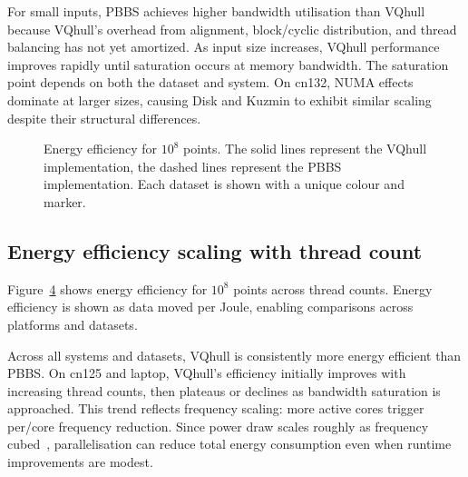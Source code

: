 For small inputs, PBBS achieves higher bandwidth utilisation than VQhull because VQhull's overhead from alignment, block\-/cyclic distribution, and thread balancing has not yet amortized.
As input size increases, VQhull performance improves rapidly until saturation occurs at memory bandwidth.
The saturation point depends on both the dataset and system.
On cn132, NUMA effects dominate at larger sizes, causing Disk and Kuzmin to exhibit similar scaling despite their structural differences.

\begin{figure}[t]
  \scriptsize
  \begin{subfigure}[b]{0.33\linewidth}
    \centering
    \label{fig:energy-cn125}%
  \end{subfigure}%
  \hfill
  \begin{subfigure}[b]{0.33\linewidth}
    \centering
    \label{fig:energy-cn132}%
  \end{subfigure}%
  \hfill
  \begin{subfigure}[b]{0.33\linewidth}
    \centering
    \label{fig:energy-laptop}%
  \end{subfigure}%
  \caption{Energy efficiency for $10^8$ points.
  The solid lines represent the VQhull implementation, the dashed lines represent the PBBS implementation.
  Each dataset is shown with a unique colour and marker.}%
  \label{fig:energy}%
\end{figure}

\subsection{Energy efficiency scaling with thread count}
Figure~\ref{fig:energy} shows energy efficiency for $10^8$ points across thread counts.
Energy efficiency is shown as data moved per Joule, enabling comparisons across platforms and datasets.

Across all systems and datasets, VQhull is consistently more energy efficient than PBBS.
On cn125 and laptop, VQhull's efficiency initially improves with increasing thread counts, then plateaus or declines as bandwidth saturation is approached.
This trend reflects frequency scaling: more active cores trigger per\-/core frequency reduction.
Since power draw scales roughly as frequency cubed~\cite{kim2015stabilizing}, parallelisation can reduce total energy consumption even when runtime improvements are modest.

